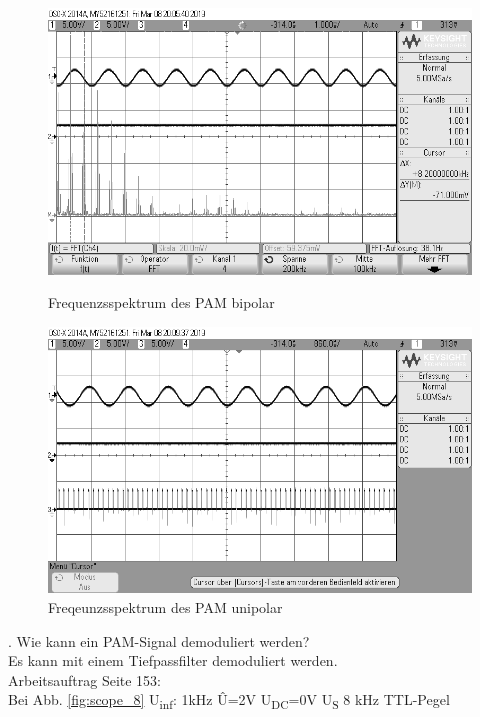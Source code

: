 \documentclass[12pt,a4paper]{scrartcl}
\begin{document}
    
    \begin{figure}[htbp]
    \begin{minipage}{0.48\textwidth}
     \centering
      \includegraphics[width=1\textwidth]{scope_12}
      \caption{Frequenzsspektrum des PAM bipolar}
      \label{fig:scope_12}
    \end{minipage}\hfill
    \begin{minipage}{0.48\textwidth}
     \centering
      \includegraphics[width=1\textwidth]{scope_13}
      \caption{Freqeunzsspektrum des PAM unipolar}
      \label{fig:scope_13}
    \end{minipage}
  \end{figure} 
  . Wie kann ein PAM-Signal demoduliert werden?\\   Es kann mit einem Tiefpassfilter demoduliert werden.   
  \\Arbeitsauftrag Seite 153:\\
 Bei Abb. \ref{fig:scope_8} U\textsubscript{inf}:  1kHz \^{U}=2V
        U\textsubscript{DC}=0V
        U\textsubscript{S} 8 kHz TTL-Pegel
        
\end{document}
